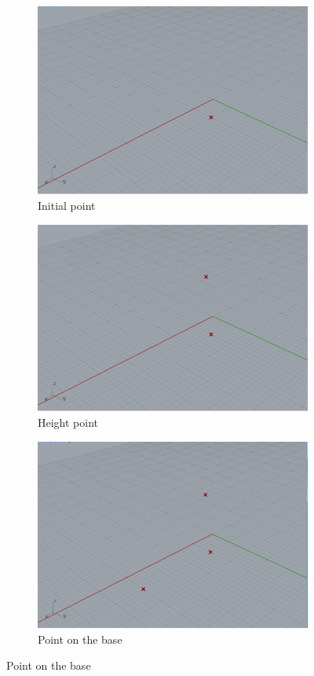 \documentclass[preprint,12pt,3p]{elsarticle}
\begin{document}
\begin{figure}
\begin{subfigure}{0.3\textwidth}
  \centering
  \includegraphics[width=.9\linewidth]{a01s00.png}
  \caption{Initial point}
  \label{fig:a01s00}
\end{subfigure}%
\begin{subfigure}{0.3\textwidth}
  \centering
  \includegraphics[width=.9\linewidth]{a01s01.png}
  \caption{Height point}
  \label{fig:a01s01}
\end{subfigure}
\begin{subfigure}{0.3\textwidth}
  \centering
  \includegraphics[width=.9\linewidth]{a01s02.png}
  \caption{Point on the base}
  \label{fig:a01s02}
\end{subfigure}



\end{figure}
\end{document}
